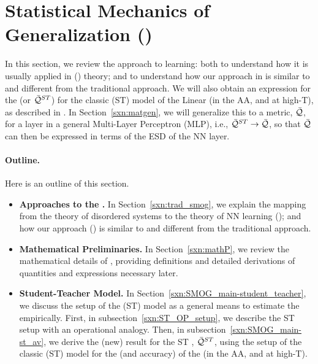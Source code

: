 \section{Statistical Mechanics of Generalization (\SMOG)}
\label{sxn:SMOG_main}

In this section, we review the \STATMECH approach to learning: 
both to understand how it is usually applied in \StatisticalMechanicsOfGeneralization (\SMOG) theory; 
and to understand how our \SemiEmpirical approach in \SETOL is similar to and different from the traditional approach.
We will also obtain an expression for the \GeneralizationAccuracy (or \ModelQuality $\bar{\mathcal{Q}}^{ST}$) for the
classic \StudentTeacher (ST) model of the Linear \Perceptron (in the AA, and at high-T),
as described in \cite{SST90,SST92}.
In Section~\ref{sxn:matgen}, we will generalize this to a \LayerQuality metric, $\bar{\mathcal{Q}}$, for a layer in a general Multi-Layer Perceptron (MLP),
i.e., $\bar{\mathcal{Q}}^{ST}\rightarrow\bar{\mathcal{Q}}$, so that $\bar{\mathcal{Q}}$ can then be expressed in terms of the ESD of the NN layer.

\paragraph{Outline.}
Here is an outline of this section.
\begin{itemize} %
\item
  \textbf{Approaches to the \SMOG.}
  In Section~\ref{sxn:trad_smog}, we explain the mapping from the \STATMECH theory of disordered systems
    to the \STATMECH theory of NN learning (\SMOG); and how our \SemiEmpirical approach (\SETOL)
    is similar to and different from the traditional approach.

  \item
      \textbf{Mathematical Preliminaries.}
    In Section~\ref{sxn:mathP}, we review the mathematical details of \STATMECH, providing definitions
      and detailed derivations of quantities and expressions necessary later.  

    \item
      \textbf{Student-Teacher Model.}
      In Section~\ref{sxn:SMOG_main-student_teacher}, we discuss the setup of the \StudentTeacher (ST) model
      as a general means to estimate the \AverageGeneralizationError empirically.
      First, in subsection~\ref{sxn:ST_OP_setup}, we describe the ST setup with an operational analogy.
       Then, in subsection~\ref{sxn:SMOG_main-st_av}, we derive the (new) result for the
    ST \ModelQuality, $\bar{\mathcal{Q}}^{ST}$, using the setup of the classic (ST) model for the
    \GeneralizationError (and accuracy) of the \Perceptron (in the AA, and at high-T).
\end{itemize} %

